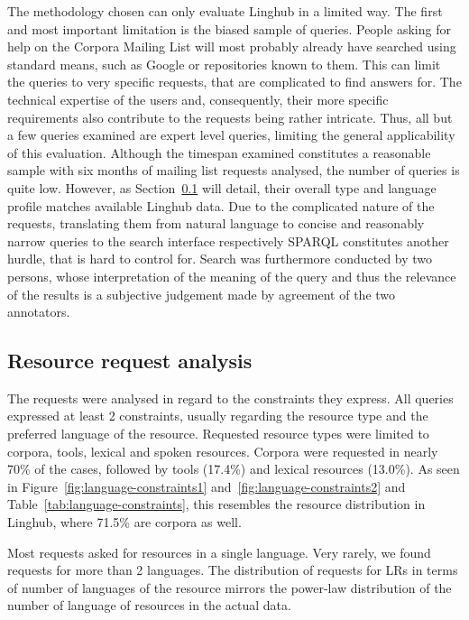 \documentclass[smallextended]{svjour3}       %
\begin{document}
The methodology chosen can only evaluate Linghub in a limited way. The first and
most important limitation is the biased sample of queries. People asking for
help on the Corpora Mailing List will most probably already have searched using
standard means, such as Google or repositories known to them. This can limit the
queries to very specific requests, that are complicated to find answers for. The
technical expertise of the users and, consequently, their more specific
requirements also contribute to the requests being rather intricate. Thus, all
but a few queries examined are expert level queries, limiting the general
applicability of this evaluation. 
Although the timespan examined constitutes a reasonable sample with six months
of mailing list requests analysed, the number of queries is quite low. However,
as Section~\ref{resource-request-analysis} will detail, their overall type and language profile matches
available Linghub data.
Due to the complicated nature of the requests, translating them from natural
language to concise and reasonably narrow queries to the search interface
respectively SPARQL constitutes another hurdle, that is hard to control for. 
Search was furthermore conducted by two persons, whose interpretation of the
meaning of the query and thus the relevance of the results is a subjective
judgement made by agreement of the two annotators.

\subsection{Resource request analysis}
\label{resource-request-analysis}

The requests were analysed in regard to the constraints they express. All
queries expressed at least 2 constraints, usually regarding the resource type
and the preferred language of the resource. Requested resource types were
limited to corpora, tools, lexical and spoken resources. Corpora were requested
in nearly 70\% of the cases, followed by tools (17.4\%) and lexical resources
(13.0\%). As seen in Figure~\ref{fig:language-constraints1}
and~\ref{fig:language-constraints2} and Table~\ref{tab:language-constraints}, 
this resembles the resource distribution in
Linghub, where 71.5\% are corpora as well. 

Most requests asked for resources in a single language. Very rarely, we found
requests for more than 2 languages. The distribution of requests for LRs in
terms of number of languages of the resource mirrors the power-law distribution
of the number of language of resources in the actual data. 
\end{document}
